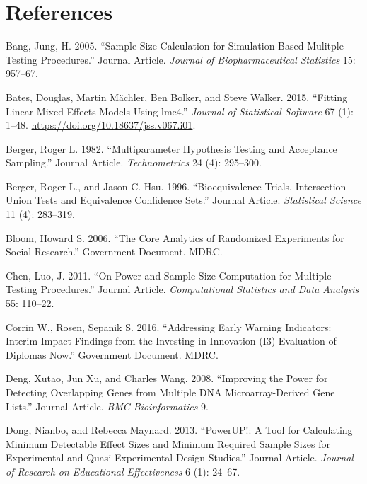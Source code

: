 \documentclass[
]{article}
\newlength{\cslhangindent}
\newlength{\cslentryspacingunit} %
\newenvironment{CSLReferences}[2] %
 {%
  \setlength{\parindent}{0pt}
  \ifodd #1
  \let\oldpar\par
  \def\par{\hangindent=\cslhangindent\oldpar}
  \fi
  \setlength{\parskip}{#2\cslentryspacingunit}
 }%
 {}
\begin{document}
\section{References}

\hypertarget{refs}{}
\begin{CSLReferences}{1}{0}
\leavevmode{}%
Bang, Jung, H. 2005. {``Sample Size Calculation for Simulation-Based
Mulitple-Testing Procedures.''} Journal Article. \emph{Journal of
Biopharmaceutical Statistics} 15: 957--67.

\leavevmode{}%
Bates, Douglas, Martin Mächler, Ben Bolker, and Steve Walker. 2015.
{``Fitting Linear Mixed-Effects Models Using {lme4}.''} \emph{Journal of
Statistical Software} 67 (1): 1--48.
\url{https://doi.org/10.18637/jss.v067.i01}.

\leavevmode{}%
Berger, Roger L. 1982. {``Multiparameter Hypothesis Testing and
Acceptance Sampling.''} Journal Article. \emph{Technometrics} 24 (4):
295--300.

\leavevmode{}%
Berger, Roger L., and Jason C. Hsu. 1996. {``Bioequivalence Trials,
Intersection--Union Tests and Equivalence Confidence Sets.''} Journal
Article. \emph{Statistical Science} 11 (4): 283--319.

\leavevmode{}%
Bloom, Howard S. 2006. {``The Core Analytics of Randomized Experiments
for Social Research.''} Government Document. MDRC.

\leavevmode{}%
Chen, Luo, J. 2011. {``On Power and Sample Size Computation for Multiple
Testing Procedures.''} Journal Article. \emph{Computational Statistics
and Data Analysis} 55: 110--22.

\leavevmode{}%
Corrin W., Rosen, Sepanik S. 2016. {``Addressing Early Warning
Indicators: Interim Impact Findings from the Investing in Innovation
(I3) Evaluation of Diplomas Now.''} Government Document. MDRC.

\leavevmode{}%
Deng, Xutao, Jun Xu, and Charles Wang. 2008. {``Improving the Power for
Detecting Overlapping Genes from Multiple DNA Microarray-Derived Gene
Lists.''} Journal Article. \emph{BMC Bioinformatics} 9.

\leavevmode{}%
Dong, Nianbo, and Rebecca Maynard. 2013. {``PowerUP!: A Tool for
Calculating Minimum Detectable Effect Sizes and Minimum Required Sample
Sizes for Experimental and Quasi-Experimental Design Studies.''} Journal
Article. \emph{Journal of Research on Educational Effectiveness} 6 (1):
24--67.


\end{CSLReferences}
\end{document}
